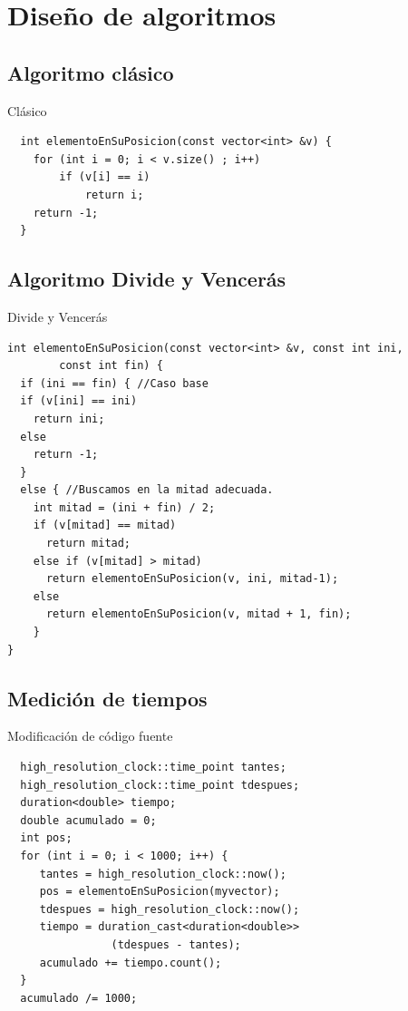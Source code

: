 \documentclass{beamer}
\begin{document}
\section{Diseño de algoritmos}

\subsection{Algoritmo clásico}

\begin{frame}[fragile]{Clásico}
\begin{verbatim}
  int elementoEnSuPosicion(const vector<int> &v) {
  	for (int i = 0; i < v.size() ; i++)
  		if (v[i] == i)
			return i;
	return -1;
  }
\end{verbatim}  
\end{frame}

\subsection{Algoritmo Divide y Vencerás}

\begin{frame}[fragile]{Divide y Vencerás}
\begin{verbatim}
int elementoEnSuPosicion(const vector<int> &v, const int ini, 
		const int fin) {
  if (ini == fin) {	//Caso base
  if (v[ini] == ini)
    return ini;
  else
    return -1;
  }
  else { //Buscamos en la mitad adecuada.
    int mitad = (ini + fin) / 2;
    if (v[mitad] == mitad)
      return mitad;
    else if (v[mitad] > mitad)
      return elementoEnSuPosicion(v, ini, mitad-1);
    else
      return elementoEnSuPosicion(v, mitad + 1, fin);
    }
}	
\end{verbatim}  
\end{frame}

\subsection{Medición de tiempos}

\begin{frame}[fragile]{Modificación de código fuente}
\begin{verbatim}
  high_resolution_clock::time_point tantes;
  high_resolution_clock::time_point tdespues;
  duration<double> tiempo;
  double acumulado = 0;
  int pos;
  for (int i = 0; i < 1000; i++) {
	 tantes = high_resolution_clock::now();
	 pos = elementoEnSuPosicion(myvector);
	 tdespues = high_resolution_clock::now();
	 tiempo = duration_cast<duration<double>>
	 	        (tdespues - tantes);
	 acumulado += tiempo.count();
  }
  acumulado /= 1000;
\end{verbatim}
\end{frame}
\end{document}
